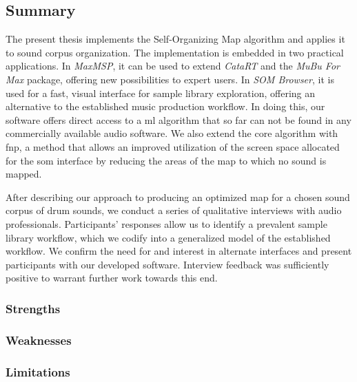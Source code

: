 \subsection{Summary}
\label{subsec:discussion_summary}
The present thesis implements the Self-Organizing Map algorithm and applies it
to sound corpus organization. The implementation is embedded in two practical
applications. In \textit{MaxMSP}, it can be used to extend \textit{CataRT} and
the \textit{MuBu For Max} package, offering new possibilities to expert users.
In \textit{SOM Browser}, it is used for a fast, visual interface for
sample library exploration, offering an alternative to the established music
production workflow. In doing this, our software offers direct access to a
\gls{ml} algorithm that so far can not be found in any commercially available
audio software. We also extend the core algorithm with \gls{fnp}, a method that
allows an improved utilization of the screen space allocated for the \gls{som}
interface by reducing the areas of the map to which no sound is mapped.

\smallskip

After describing our approach to producing an optimized map for a chosen sound
corpus of drum sounds, we conduct a series of qualitative interviews with audio
professionals. Participants' responses allow us to identify a prevalent sample
library workflow, which we codify into a generalized model of the established
workflow. We confirm the need for and interest in alternate interfaces and
present participants with our developed software. Interview feedback was
sufficiently positive to warrant further work towards this end.


\subsubsection{Strengths}
\label{subsubsec:discussion_strengths}



\subsubsection{Weaknesses}
\label{subsubsec:discussion_weaknesses}

\subsubsection{Limitations}
\label{subsubsec:discussion_limitations}



